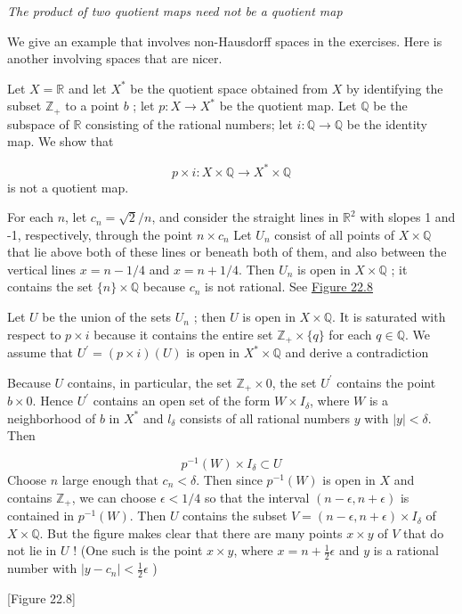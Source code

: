 \begin{centeredblock*}
\begin{example}
\label{ex:\thesection.\theexample}
 \textit{The product of two quotient maps need not be a quotient map}

 We give an example that involves non-Hausdorff spaces in the exercises. Here is another involving spaces that are nicer.

 Let \(X = \mathbb{R}\) and let \(X^{ * }\) be the quotient space obtained from \(X\) by identifying the subset \(\mathbb{Z}_{ + }\) to a point \(b\) ; let \(p : X \rightarrow {X}^{ * }\) be the quotient map. Let \(\mathbb{Q}\) be the subspace of \(\mathbb{R}\) consisting of the rational numbers; let \(i : \mathbb{Q} \rightarrow \mathbb{Q}\) be the identity map. We show that

 \[
 p \times i : X \times \mathbb{Q} \rightarrow {X}^{ * } \times \mathbb{Q}
 \]
 is not a quotient map.

 For each \(n\), let \(c_{n} = \sqrt{2}/n\), and consider the straight lines in \(\mathbb{R}^{2}\) with slopes 1 and -1, respectively, through the point \(n \times {c}_{n}\) Let \(U_{n}\) consist of all points of \(X \times \mathbb{Q}\) that lie above both of these lines or beneath both of them, and also between the vertical lines \(x = n - 1/4\) and \(x = n + 1/4\). Then \(U_{n}\) is open in \(X \times \mathbb{Q}\) ; it contains the set \(\{ n\} \times \mathbb{Q}\) because \(c_{n}\) is not rational. See \hyperref[fig:22.8]{Figure 22.8}

 Let \(U\) be the union of the sets \(U_{n}\) ; then \(U\) is open in \(X \times \mathbb{Q}\). It is saturated with respect to \(p \times i\) because it contains the entire set \(\mathbb{Z}_{ + } \times \{ q\}\) for each \(q \in \mathbb{Q}\). We assume that \(U^{\prime } = ( {p \times i}) ( U)\) is open in \(X^{ * } \times \mathbb{Q}\) and derive a contradiction

 Because \(U\) contains, in particular, the set \(\mathbb{Z}_{ + } \times 0\), the set \(U^{\prime }\) contains the point \(b \times 0\). Hence \(U^{\prime }\) contains an open set of the form \(W \times {I}_{\delta }\), where \(W\) is a neighborhood of \(b\) in \(X^{ * }\) and \(l_{\delta }\) consists of all rational numbers \(y\) with \(| y| < \delta\). Then

 \[
 p^{-1}( W) \times {I}_{\delta } \subset U
 \]
 Choose \(n\) large enough that \(c_{n} < \delta\). Then since \(p^{-1}( W)\) is open in \(X\) and contains \(\mathbb{Z}_{ + }\), we can choose \(\epsilon < 1/4\) so that the interval \(( {n - \epsilon,n + \epsilon })\) is contained in \(p^{-1}( W)\). Then \(U\) contains the subset \(V = ( {n - \epsilon,n + \epsilon }) \times {I}_{\delta }\) of \(X \times \mathbb{Q}\). But the figure makes clear that there are many points \(x \times y\) of \(V\) that do not lie in \(U\) ! (One such is the point \(x \times y\), where \(x = n + \frac{1}{2}\epsilon\) and \(y\) is a rational number with \(| {y - c_{n}}| < \frac{1}{2}\epsilon\) )

 [Figure 22.8]
\end{example}
\end{centeredblock*}

